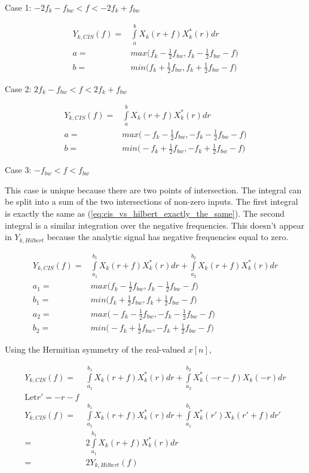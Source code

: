 \documentclass [11pt, proquest,oneside] {ganter_thesis}[2015/03/03]
\begin{document}
Case 1: $-2f_k - f_{bw} < f < -2f_k + f_{bw}$

\begin{align}
Y_{k,CIS}(f) =& \int\limits_{a}^{b} X_{k}(r + f) X_{k}^*(r)dr \\
%
a =& max\Big( f_k - \frac{1}{2} f_{bw},  f_k - \frac{1}{2} f_{bw} - f\Big) \\
b =& min\Big( f_k + \frac{1}{2} f_{bw},  f_k + \frac{1}{2} f_{bw} - f\Big)
\end{align}

Case 2: $2f_k - f_{bw} < f < 2f_k + f_{bw}$

\begin{align}
Y_{k,CIS}(f) =& \int\limits_{a}^{b} X_{k}(r + f) X_{k}^*(r)dr \\
%
a =& max\Big( -f_k - \frac{1}{2} f_{bw},  -f_k - \frac{1}{2} f_{bw} - f\Big) \\
b =& min\Big( -f_k + \frac{1}{2} f_{bw},  -f_k + \frac{1}{2} f_{bw} - f\Big)
\end{align}

Case 3: $- f_{bw} < f < f_{bw}$

This case is unique because there are two points of intersection.  The integral can be split into a sum of the two intersections of non-zero inputs.  The first integral is exactly the same as (\ref{eq:cis_vs_hilbert_exactly_the_same}).  The second integral is a similar integration over the negative frequencies.  This doesn't appear in $Y_{k,Hilbert}$ because the analytic signal has negative frequencies equal to zero.

\begin{align}
Y_{k,CIS}(f) =& \int\limits_{a_1}^{b_1} X_{k}(r + f) X_{k}^*(r)dr + \int\limits_{a_2}^{b_2} X_{k}(r + f) X_{k}^*(r)dr \\
a_1 =& max\Big( f_k - \frac{1}{2} f_{bw},  f_k - \frac{1}{2} f_{bw} - f\Big) \\
b_1 =& min\Big( f_k + \frac{1}{2} f_{bw},  f_k + \frac{1}{2} f_{bw} - f\Big) \\
a_2 =& max\Big( -f_k - \frac{1}{2} f_{bw},  -f_k - \frac{1}{2} f_{bw} - f\Big) \\
b_2 =& min\Big( -f_k + \frac{1}{2} f_{bw},  -f_k + \frac{1}{2} f_{bw} - f\Big)
\end{align}

Using the Hermitian symmetry of the real-valued $x[n]$,

\begin{align}
Y_{k,CIS}(f) =& \int\limits_{a_1}^{b_1} X_{k}(r + f) X_{k}^*(r)dr + \int\limits_{a_2}^{b_2} X_{k}^*(-r - f) X_{k}(-r)dr \\
%
\mathrm{Let} r' = -r - f \nonumber \\
%
Y_{k,CIS}(f) =& \int\limits_{a_1}^{b_1} X_{k}(r + f) X_{k}^*(r)dr + \int\limits_{a_1}^{b_1} X_{k}^*(r') X_{k}(r' + f)dr' \\
=& 2 \int\limits_{a_1}^{b_1} X_{k}(r + f) X_{k}^*(r)dr \\
=& 2 Y_{k,Hilbert}(f)
\end{align}
\end{document}
